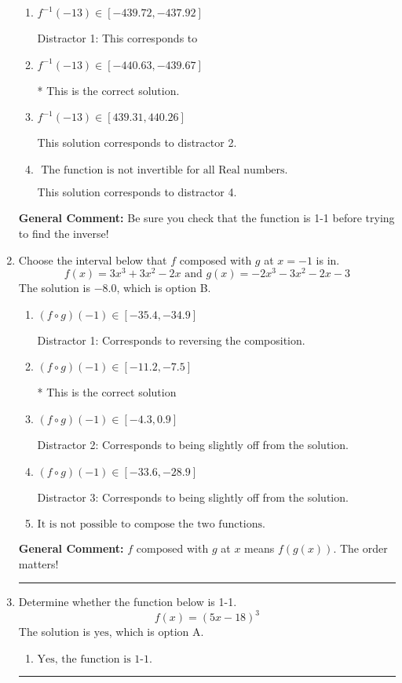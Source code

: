 \documentclass{extbook}[14pt]
\newcommand{\litem}[1]{\item #1

\rule{\textwidth}{0.4pt}}
\begin{document}
\begin{enumerate}
{\begin{enumerate}[label=\Alph*.]
 This solution corresponds to distractor 3.
\item \( f^{-1}(-13) \in [-439.72, -437.92] \)

 Distractor 1: This corresponds to 
\item \( f^{-1}(-13) \in [-440.63, -439.67] \)

* This is the correct solution.
\item \( f^{-1}(-13) \in [439.31, 440.26] \)

 This solution corresponds to distractor 2.
\item \( \text{ The function is not invertible for all Real numbers. } \)

 This solution corresponds to distractor 4.
\end{enumerate}

\textbf{General Comment:} Be sure you check that the function is 1-1 before trying to find the inverse!
}
\litem{
Choose the interval below that $f$ composed with $g$ at $x=-1$ is in.
\[ f(x) = 3x^{3} +3 x^{2} -2 x \text{ and } g(x) = -2x^{3} -3 x^{2} -2 x -3 \]The solution is \( -8.0 \), which is option B.\begin{enumerate}[label=\Alph*.]
\item \( (f \circ g)(-1) \in [-35.4, -34.9] \)

 Distractor 1: Corresponds to reversing the composition.
\item \( (f \circ g)(-1) \in [-11.2, -7.5] \)

* This is the correct solution
\item \( (f \circ g)(-1) \in [-4.3, 0.9] \)

 Distractor 2: Corresponds to being slightly off from the solution.
\item \( (f \circ g)(-1) \in [-33.6, -28.9] \)

 Distractor 3: Corresponds to being slightly off from the solution.
\item \( \text{It is not possible to compose the two functions.} \)


\end{enumerate}

\textbf{General Comment:} $f$ composed with $g$ at $x$ means $f(g(x))$. The order matters!
}
\litem{
Determine whether the function below is 1-1.
\[ f(x) = (5 x - 18)^3 \]The solution is \( \text{yes} \), which is option A.\begin{enumerate}[label=\Alph*.]
\item \( \text{Yes, the function is 1-1.} \)


\end{enumerate}}
\end{enumerate}
\end{document}
